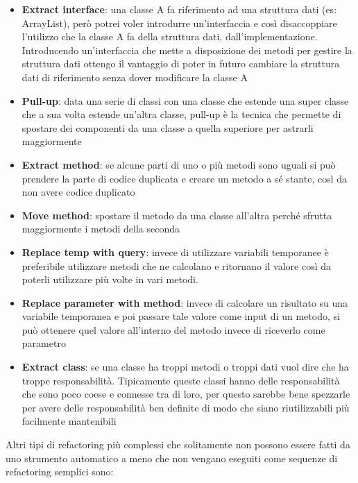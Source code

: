 \begin{itemize}[noitemsep]
    \item \textbf{Extract interface}: una classe A fa riferimento ad una struttura dati (es: ArrayList), però potrei voler introdurre un'interfaccia e così disaccoppiare l'utilizzo che la classe A fa della struttura dati, dall'implementazione. Introducendo un'interfaccia che mette a disposizione dei metodi per gestire la struttura dati ottengo il vantaggio di poter in futuro cambiare la struttura dati di riferimento senza dover modificare la classe A
    \item \textbf{Pull-up}: data una serie di classi con una classe che estende una super classe che a sua volta estende un'altra classe, pull-up è la tecnica che permette di spostare dei componenti da una classe a quella superiore per astrarli maggiormente
    \item \textbf{Extract method}: se alcune parti di uno o più metodi sono uguali si può prendere la parte di codice duplicata e creare un metodo a sé stante, così da non avere codice duplicato
    \item \textbf{Move method}: spostare il metodo da una classe all'altra perché sfrutta maggiormente i metodi della seconda
    \item \textbf{Replace temp with query}: invece di utilizzare variabili temporanee è preferibile utilizzare metodi che ne calcolano e ritornano il valore così da poterli utilizzare più volte in vari metodi.
    \item \textbf{Replace parameter with method}: invece di calcolare un risultato su una variabile temporanea e poi passare tale valore come input di un metodo, si può ottenere quel valore all'interno del metodo invece di riceverlo come parametro
    \item \textbf{Extract class}: se una classe ha troppi metodi o troppi dati vuol dire che ha troppe responsabilità. Tipicamente queste classi hanno delle responsabilità che sono poco coese e connesse tra di loro, per questo sarebbe bene spezzarle per avere delle responsabilità ben definite di modo che siano riutilizzabili più facilmente mantenibili
\end{itemize}
Altri tipi di refactoring più complessi che solitamente non possono essere fatti da uno strumento automatico a meno che non vengano eseguiti come sequenze di refactoring semplici sono:

